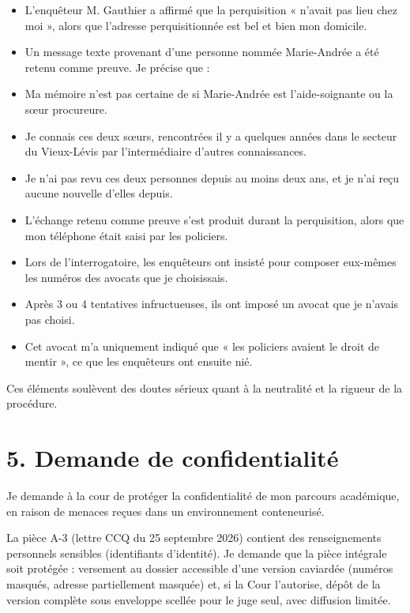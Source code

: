 \documentclass[12pt,a4paper]{article}
\begin{document}
\begin{itemize}
  \item L’enquêteur M. Gauthier a affirmé que la perquisition « n’avait pas lieu chez moi », alors que l’adresse perquisitionnée est bel et bien mon domicile.
  \item Un message texte provenant d’une personne nommée Marie-Andrée a été retenu comme preuve. Je précise que :
  \item Ma mémoire n’est pas certaine de si Marie-Andrée est l’aide-soignante ou la sœur procureure.
  \item Je connais ces deux sœurs, rencontrées il y a quelques années dans le secteur du Vieux-Lévis par l’intermédiaire d’autres connaissances.
  \item Je n’ai pas revu ces deux personnes depuis au moins deux ans, et je n’ai reçu aucune nouvelle d’elles depuis.
  \item L’échange retenu comme preuve s’est produit durant la perquisition, alors que mon téléphone était saisi par les policiers.
  \item Lors de l’interrogatoire, les enquêteurs ont insisté pour composer eux-mêmes les numéros des avocats que je choisissais.
  \item Après 3 ou 4 tentatives infructueuses, ils ont imposé un avocat que je n’avais pas choisi.
  \item Cet avocat m’a uniquement indiqué que « les policiers avaient le droit de mentir », ce que les enquêteurs ont ensuite nié.
\end{itemize}

Ces éléments soulèvent des doutes sérieux quant à la neutralité et la rigueur de la procédure.

\section*{5. Demande de confidentialité}
Je demande à la cour de protéger la confidentialité de mon parcours académique, en raison de menaces reçues dans un environnement conteneurisé.

La pièce A-3 (lettre CCQ du 25 septembre 2026) contient des renseignements personnels sensibles (identifiants d’identité). Je demande que la pièce intégrale soit protégée : versement au dossier accessible d’une version caviardée (numéros masqués, adresse partiellement masquée) et, si la Cour l’autorise, dépôt de la version complète sous enveloppe scellée pour le juge seul, avec diffusion limitée.
\end{document}

